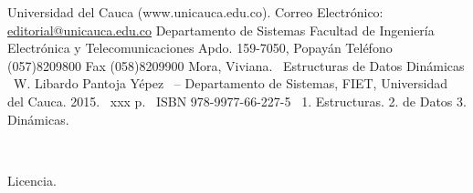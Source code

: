 \documentclass[11pt,fleqn,x11names,table]{book}
\begin{document}


\parindent=0mm    %
\pagestyle{empty}

\clearpage
\begin{copyrightpage}{%
   Universidad del Cauca (www.unicauca.edu.co). 
   Correo Electr\'onico: \url{editorial@unicauca.edu.co}
   Departamento de Sistemas
   Facultad de Ingeniería Electrónica y Telecomunicaciones
   Apdo. 159-7050, Popayán
   Teléfono (057)8209800
   Fax (058)8209900}%
Mora, Viviana.
\    Estructuras de Datos Dinámicas
\ W. Libardo Pantoja Yépez
\ -- Departamento de Sistemas, FIET, Universidad del Cauca.  2015.
\    xxx p.
\ ISBN 978-9977-66-227-5
\    1. Estructuras.  2. de Datos 3. Dinámicas.\\     
\end{copyrightpage}
~\vfill

\noindent 
\parbox[s]{0.35\textwidth}{Licencia.}\parbox[c]{0.65\textwidth}{
 \color{gray}
 \\
 \\
 }\\\\ %

\end{document}
